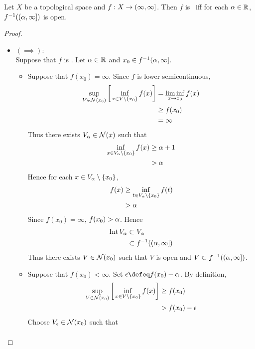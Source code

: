 \documentclass{book}
\begin{document}
	\begin{ex} \lex{}
	Let $X$ be a topological space and $f: X \rightarrow (\infty, \infty]$. Then $f$ is \lsc\ iff for each $\alpha \in \mathbb{R}$, $f^{-1}((\alpha, \infty])$ is open. 
	\end{ex}
	
	\begin{proof}\
	\begin{itemize}
		\item $(\implies):$ \\
		Suppose that $f$ is \lsc. Let $\alpha \in \mathbb{R}$ and $x_0 \in f^{-1}(\alpha, \infty]$. 
		\begin{itemize}
			\item Suppose that $f(x_0) = \infty$. Since $f$ is lower semicontinuous, 
			\begin{align*}
				\sup_{V \in \mathcal{N}(x_0)} \bigg[ \inf_{x \in V\setminus \{x_0\} } f(x) \bigg] 
				& = \liminf_{x \rightarrow x_0} f(x) \\
				& \geq f(x_0) \\
				& = \infty
			\end{align*}
			Thus there exists $V_{\alpha} \in \mathcal{N}(x)$ such that 
			\begin{align*}
				\inf\limits_{x \in V_{\alpha} \setminus \{x_0\} } f(x) 
				& \geq \alpha + 1 \\
				& > \alpha 
			\end{align*}
			Hence for each $x \in V_{\alpha} \setminus \{x_0\}$,
			\begin{align*}
				f(x)
				& \geq \inf\limits_{t \in V_{\alpha} \setminus \{x_0\} } f(t) \\
				& > \alpha 
			\end{align*}
			Since $f(x_0) = \infty$, $f(x_0) > \alpha$. Hence  
			\begin{align*}
				\operatorname{Int} V_{\alpha} 
				& \subset V_{\alpha} \\
				& \subset f^{-1}((\alpha, \infty])
			\end{align*} 
			Thus there exists $V \in \mathcal{N}(x_0)$ such that $V$ is open and $V \subset f^{-1}((\alpha, \infty])$.
			\item Suppose that $f(x_0) < \infty$. Set $\ep \defeq f(x_0) - \al$. By definition,  
			\begin{align*}
				\sup_{V \in \mathcal{N}(x_0)} \bigg[ \inf_{x \in V \setminus \{x_0\}} f(x)  \bigg]
				& \geq f(x_0) \\
				& > f(x_0) - \epsilon 
			\end{align*}
			Choose $V_{\epsilon} \in \mathcal{N}(x_0)$ such that 
			\begin{align*}

\end{align*}
\end{itemize}
\end{itemize}
\end{proof}
\end{document}
